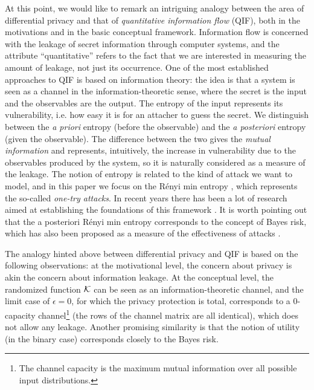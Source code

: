 \documentclass{llncs}
\begin{document}
At this point, we would like to remark an intriguing analogy between the area of differential privacy and that of \emph{quantitative information flow} (QIF), both in the motivations and in the basic conceptual framework. 
Information flow is concerned with the leakage of secret information through computer systems, and the attribute ``quantitative'' refers to the fact that we are interested in measuring the amount of leakage, not just its occurrence. 
One of the most established approaches to QIF is based on information theory: the idea is that 
a system is seen as a channel in the information-theoretic sense, where the secret is the input and the observables are the output. The entropy of the input represents its vulnerability, i.e. how easy it is for an attacher to guess the secret. 
We distinguish between the \emph{ a priori} entropy (before the observable) and the \emph{a posteriori} entropy (given the observable). The difference between the two gives the \emph{mutual information} and represents, intuitively, the increase in vulnerability 
due to the observables produced by the system, so it is naturally considered as a measure of the leakage. 
The notion of entropy is related to the kind of attack we want to model, and in this paper we focus on the  R\'enyi min entropy \cite{Renyi:61:Berkeley}, which represents the so-called \emph{one-try attacks}. 
In recent years there has been a lot of research aimed at establishing the foundations of this framework \cite{Smith:09:FOSSACS,Braun:09:MFPS,Kopf:10:CSF,Andres:10:TACAS,Boreale:11:FOSSACS}.
It is worth pointing out that the a posteriori R\'enyi min entropy corresponds to the concept of Bayes risk, which has also been proposed as a measure of the effectiveness of attacks \cite{Chatzikokolakis:07:CSF,Braun:08:FOSSACS,McIver:10:ICALP}.

The analogy hinted above between differential privacy and QIF is based on the following observations:
at the motivational level, the concern about privacy is akin the concern about information leakage.  
At the conceptual level, the randomized function $\cal K$ can be seen as an information-theoretic channel, 
and the limit case of $\epsilon = 0$, for which the privacy protection is total,  
corresponds to a $0$-capacity channel\footnote{The channel capacity is the maximum mutual information over all possible input distributions.} (the rows of the channel matrix are all identical), which does not allow any leakage. Another promising similarity is that the notion of utility (in the binary case) corresponds closely to the Bayes risk. 
\end{document}
